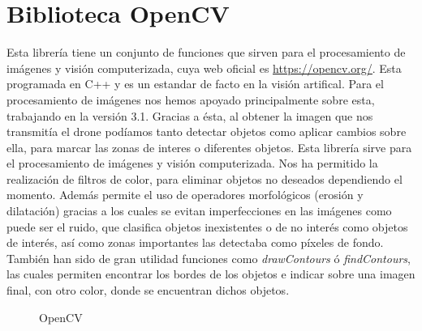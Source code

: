 \section{Biblioteca OpenCV}
\label{sec:BibliotecaOpenCV} 
\hspace{1 cm} Esta librer\'ia tiene un conjunto de funciones que sirven para el procesamiento de im\'agenes y visi\'on computerizada, cuya web oficial es \underline{\url{https://opencv.org/}}. Esta programada en C++ y es un estandar de facto en la visi\'on artifical. Para el procesamiento de im\'agenes nos hemos apoyado principalmente sobre esta, trabajando en la versi\'on 3.1. Gracias a \'esta, al obtener la imagen que nos transmit\'ia el drone pod\'iamos tanto detectar objetos como aplicar cambios sobre ella, para marcar las zonas de interes o diferentes objetos. Esta librer\'ia sirve para el procesamiento de im\'agenes y visi\'on computerizada. Nos ha permitido la realizaci\'on de filtros de color, para eliminar objetos no deseados dependiendo el momento. Adem\'as permite el uso de operadores morfol\'ogicos (erosi\'on y dilataci\'on) gracias a los cuales se evitan imperfecciones en las im\'agenes como puede ser el ruido, que clasifica objetos inexistentes o de no inter\'es como objetos de inter\'es, as\'i como zonas importantes las detectaba como p\'ixeles de fondo. Tambi\'en han sido de gran utilidad funciones como \textit{drawContours} \'o \textit{findContours}, las cuales permiten encontrar los bordes de los objetos e indicar sobre una imagen final, con otro color, donde se encuentran dichos objetos. 



\begin{figure}[H]
 \centering
 \caption{OpenCV}
 \label{f:OpenCV}
\end{figure} 









